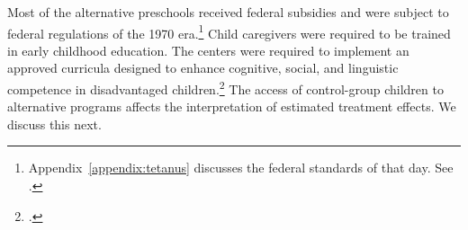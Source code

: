 Most of the alternative preschools received federal subsidies and were subject to federal regulations of the 1970 era.\footnote{Appendix~\ref{appendix:tetanus} discusses the federal standards of that day. See \citet{Department-of-Health_1968_DayCareRequirements,NCGA_1971_House-Bill-100,Ramey-et-al_1977_Intro-to-ABC,Ramey_Campbell_1979_SR,Ramey_McGinness_etal_1982_Abecedarianapproach, Burchinal_Campbell_etal_1997_CD}.} Child caregivers were required to be trained in early childhood education. The centers were required to implement an approved curricula designed to enhance cognitive, social, and linguistic competence in disadvantaged children.\footnote{\citet{Burchinal_etal_1989_CD_Daycare-Pre-K-Dev}.} The access of control-group children to alternative programs affects the interpretation of estimated treatment effects. We discuss this next.

